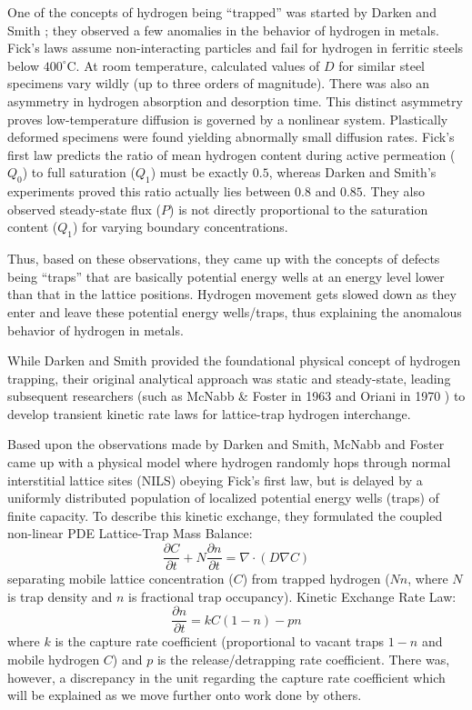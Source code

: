 \documentclass[a4paper,12pt,oneside]{report}
\begin{document}
One of the concepts of hydrogen being ``trapped'' was started by Darken and Smith \cite{Darken1949}; they observed a few anomalies in the behavior of hydrogen in metals. Fick's laws assume non-interacting particles and fail for hydrogen in ferritic steels below $400^\circ\text{C}$. At room temperature, calculated values of $D$ for similar steel specimens vary wildly (up to three orders of magnitude). There was also an asymmetry in hydrogen absorption and desorption time. This distinct asymmetry proves low-temperature diffusion is governed by a nonlinear system. Plastically deformed specimens were found yielding abnormally small diffusion rates. Fick's first law predicts the ratio of mean hydrogen content during active permeation ($Q_0$) to full saturation ($Q_1$) must be exactly $0.5$, whereas Darken and Smith's experiments proved this ratio actually lies between $0.8$ and $0.85$. They also observed steady-state flux ($P$) is not directly proportional to the saturation content ($Q_1$) for varying boundary concentrations.

Thus, based on these observations, they came up with the concepts of defects being ``traps'' that are basically potential energy wells at an energy level lower than that in the lattice positions. Hydrogen movement gets slowed down as they enter and leave these potential energy wells/traps, thus explaining the anomalous behavior of hydrogen in metals.

While Darken and Smith provided the foundational physical concept of hydrogen trapping, their original analytical approach was static and steady-state, leading subsequent researchers (such as McNabb \& Foster in 1963 \cite{McNabb1963} and Oriani in 1970 \cite{Oriani1970}) to develop transient kinetic rate laws for lattice-trap hydrogen interchange. 

Based upon the observations made by Darken and Smith, McNabb and Foster \cite{McNabb1963} came up with a physical model where hydrogen randomly hops through normal interstitial lattice sites (NILS) obeying Fick's first law, but is delayed by a uniformly distributed population of localized potential energy wells (traps) of finite capacity. To describe this kinetic exchange, they formulated the coupled non-linear PDE Lattice-Trap Mass Balance: 
\begin{equation}
    \frac{\partial C}{\partial t} + N \frac{\partial n}{\partial t} = \nabla \cdot (D \nabla C)
\end{equation}
separating mobile lattice concentration ($C$) from trapped hydrogen ($N n$, where $N$ is trap density and $n$ is fractional trap occupancy). Kinetic Exchange Rate Law: 
\begin{equation}
    \frac{\partial n}{\partial t} = k C (1 - n) - p n
\end{equation}
where $k$ is the capture rate coefficient (proportional to vacant traps $1-n$ and mobile hydrogen $C$) and $p$ is the release/detrapping rate coefficient. There was, however, a discrepancy in the unit regarding the capture rate coefficient which will be explained as we move further onto work done by others.
\end{document}
